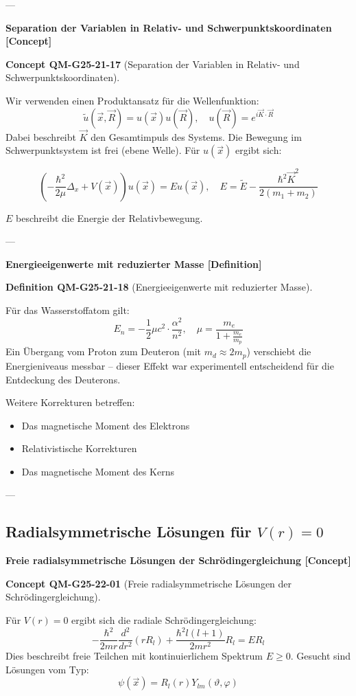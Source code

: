 \documentclass[10pt, letterpaper]{article}
\newcommand{\CustomHeading}[3]{%
  \par\medskip\noindent%
  \textbf{#1 #2} \textnormal{(#3)}.\enskip%
}
\newenvironment{DEF}[2]{\begin{unitbox}\CustomHeading{Definition}{#1}{#2}}{\end{unitbox}}
\newenvironment{CONC}[2]{\begin{unitbox}\CustomHeading{Concept}{#1}{#2}}{\end{unitbox}}
\begin{document}
---

\textbf{Separation der Variablen in Relativ- und Schwerpunktskoordinaten [Concept]}

\begin{CONC}{QM-G25-21-17}{Separation der Variablen in Relativ- und Schwerpunktskoordinaten}
Wir verwenden einen Produktansatz für die Wellenfunktion:
\[
\tilde{u}(\vec{x}, \vec{R}) = u(\vec{x}) u(\vec{R}), \quad u(\vec{R}) = e^{i \vec{K} \cdot \vec{R}}
\]
Dabei beschreibt $\vec{K}$ den Gesamtimpuls des Systems. Die Bewegung im Schwerpunktsystem ist frei (ebene Welle). Für $u(\vec{x})$ ergibt sich:

\[
\left( -\frac{\hbar^2}{2\mu} \Delta_x + V(\vec{x}) \right) u(\vec{x}) = E u(\vec{x}), \quad E = \tilde{E} - \frac{\hbar^2 \vec{K}^2}{2(m_1 + m_2)}
\]

$E$ beschreibt die Energie der Relativbewegung.
\end{CONC}

---

\textbf{Energieeigenwerte mit reduzierter Masse [Definition]}

\begin{DEF}{QM-G25-21-18}{Energieeigenwerte mit reduzierter Masse}
Für das Wasserstoffatom gilt:
\[
E_n = -\frac{1}{2} \mu c^2 \cdot \frac{\alpha^2}{n^2}, \quad \mu = \frac{m_e}{1 + \frac{m_e}{m_p}}
\]
Ein Übergang vom Proton zum Deuteron (mit $m_d \approx 2m_p$) verschiebt die Energieniveaus messbar – dieser Effekt war experimentell entscheidend für die Entdeckung des Deuterons.

Weitere Korrekturen betreffen:
\begin{itemize}
  \item Das magnetische Moment des Elektrons
  \item Relativistische Korrekturen
  \item Das magnetische Moment des Kerns
\end{itemize}
\end{DEF}

---


\pagebreak



\subsection{Radialsymmetrische Lösungen für $V(r)=0$}

\textbf{Freie radialsymmetrische Lösungen der Schrödingergleichung [Concept]}

\begin{CONC}{QM-G25-22-01}{Freie radialsymmetrische Lösungen der Schrödingergleichung}
Für $V(r) = 0$ ergibt sich die radiale Schrödingergleichung:
\[
-\frac{\hbar^2}{2m r} \frac{d^2}{dr^2}(r R_l) + \frac{\hbar^2 l(l+1)}{2m r^2} R_l = E R_l
\]
Dies beschreibt freie Teilchen mit kontinuierlichem Spektrum $E \geq 0$. Gesucht sind Lösungen vom Typ:
\[
\psi(\vec{x}) = R_l(r) Y_{lm}(\vartheta, \varphi)
\]
\end{CONC}
\end{document}
